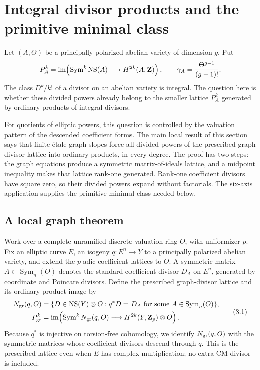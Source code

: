 \section{Integral divisor products and the primitive minimal class}
\label{sec:minimal-class}

Let \((A,\Theta)\) be a principally polarized abelian variety of dimension
\(g\).  Put
\[
 P_A^k=\operatorname{im}\!\left(
 \operatorname{Sym}^k\operatorname{NS}(A)\longrightarrow H^{2k}(A,\mathbf Z)
 \right),
 \qquad
 \gamma_A=\frac{\Theta^{g-1}}{(g-1)!}.
\]
The class \(D^k/k!\) of a divisor on an abelian variety is integral.  The
question here is whether these divided powers already belong to the smaller
lattice \(P_A^k\) generated by ordinary products of integral divisors.

For quotients of elliptic powers, this question is controlled by the
valuation pattern of the descended coefficient forms.  The main local result
of this section says that finite-\'etale graph slopes force all divided powers
of the prescribed graph divisor lattice into ordinary products, in every
degree.  The proof has two steps: the graph equations produce a symmetric
matrix-of-ideals lattice, and a midpoint inequality makes that lattice
rank-one generated.  Rank-one coefficient divisors have square zero, so their
divided powers expand without factorials.  The six-axis application supplies
the primitive minimal class needed below.

\subsection{A local graph theorem}

Work over a complete unramified discrete valuation ring \(O\), with
uniformizer \(p\).  Fix an elliptic curve \(E\), an isogeny
\(q:E^n\to Y\) to a principally polarized abelian variety, and extend the
\(p\)-adic coefficient lattices to \(O\).  A symmetric matrix
\(A\in\operatorname{Sym}_n(O)\) denotes the standard coefficient divisor
\(D_A\) on \(E^n\), generated by coordinate and Poincare divisors.  Define
the prescribed graph-divisor lattice and its ordinary product image by
\[
 \begin{aligned}
 N_{\rm gr}(q,O)
 &=\{D\in\operatorname{NS}(Y)\otimes O:q^*D=D_A
       \text{ for some }A\in\operatorname{Sym}_n(O)\},\\
 P_{\rm gr}^k
 &=\operatorname{im}\!\left(
   \operatorname{Sym}^kN_{\rm gr}(q,O)\longrightarrow
   H^{2k}(Y,\mathbf Z_p)\otimes O\right).
 \end{aligned}
 \tag{3.1}
\]
Because \(q^*\) is injective on torsion-free cohomology, we identify
\(N_{\rm gr}(q,O)\) with the symmetric matrices whose coefficient divisors
descend through \(q\).  This is the prescribed lattice even when \(E\) has
complex multiplication; no extra CM divisor is included.

